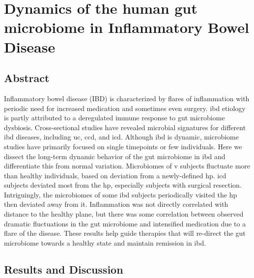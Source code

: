 \glsresetall

\section{Dynamics of the human gut microbiome in Inflammatory Bowel Disease}

\subsection{Abstract}

Inflammatory bowel disease (IBD) is characterized by flares of inflammation with periodic need for increased medication and sometimes even surgery. \gls{ibd} etiology is partly attributed to a deregulated immune response to gut microbiome dysbiosis. Cross-sectional studies have revealed microbial signatures for different \gls{ibd} diseases, including \gls{uc}, \gls{ccd}, and \gls{icd}. Although \gls{ibd} is dynamic, microbiome studies have primarily focused on single timepoints or few individuals. Here we dissect the long-term dynamic behavior of the gut microbiome in \gls{ibd} and differentiate this from normal variation. Microbiomes of v subjects fluctuate more than healthy individuals, based on deviation from a newly-defined \gls{hp}. \Gls{icd} subjects deviated most from the \gls{hp}, especially subjects with surgical resection. Intriguingly, the microbiomes of some \gls{ibd} subjects periodically visited the \gls{hp} then deviated away from it. Inflammation was not directly correlated with distance to the healthy plane, but there was some correlation between observed dramatic fluctuations in the gut microbiome and intensified medication due to a flare of the disease. These results help guide therapies that will re-direct the gut microbiome towards a healthy state and maintain remission in \gls{ibd}.

\subsection{Results and Discussion}

